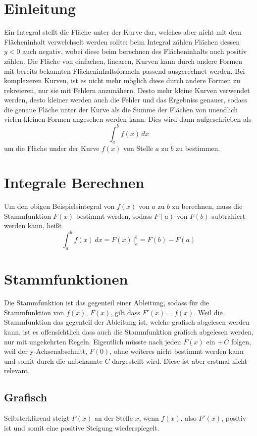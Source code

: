 \documentclass{article}
\begin{document}
 
\section{Einleitung}
Ein Integral stellt die Fläche unter der Kurve dar, welches aber nicht mit dem Flächeninhalt verwelchselt werden sollte: beim Integral zählen Flächen dessen $y<0$ auch negativ, wobei diese beim berechnen des Flächeninhalts auch positiv zählen. \newline
Die Fläche von einfachen, linearen, Kurven kann durch andere Formen mit bereits bekannten Flächeninhaltsformeln passend ausgerechnet werden. Bei komplexeren Kurven, ist es nicht mehr möglich diese durch andere Formen zu rekreieren, nur sie mit Fehlern anzunähern. Desto mehr kleine Kurven verwendet werden, desto kleiner werden auch die Fehler und das Ergebniss genauer, sodass die genaue Fläche unter der Kurve als die Summe der Flächen von unendlich vielen kleinen Formen angesehen werden kann. \newline
Dies wird dann aufgeschrieben als
\[\int_a^b f(x) \,dx\] 
um die Fläche under der Kurve $f(x)$ von Stelle $a$ zu $b$ zu bestimmen.
 
\section{Integrale Berechnen}
Um den obigen Beispielsintegral von $f(x)$ von $a$ zu $b$ zu berechnen, muss die Stammfunktion $F(x)$ bestimmt werden, sodass $F(a)$ von $F(b)$ subtrahiert werden kann, heißt
\[\int_a^b f(x) \,dx =
F(x) \,\Bigr|_a^b =
F(b) - F(a)\]
 
\section{Stammfunktionen}
Die Stammfunktion ist das gegenteil einer Ableitung, sodass für die Stammfunktion von $f(x)$, $F(x)$, gilt dass $F'(x)=f(x)$. Weil die Stammfunktion das gegenteil der Ableitung ist, welche grafisch abgelesen werden kann, ist es offensichtlich dass auch die Stammfunktion grafisch abgelesen werden, nur mit ungekehrten Regeln. \newline
Eigentlich müsste nach jeden $F(x)$ ein $+ \, C$ folgen, weil der y-Achsenabschnitt, $F(0)$, ohne weiteres nicht bestimmt werden kann und somit durch die unbekannte $C$ dargestellt wird. Diese ist aber erstmal nicht relevant. 
 
\subsection{Grafisch}
Selbsterklärend steigt $F(x)$ an der Stelle $x$, wenn $f(x)$, also $F'(x)$, positiv ist und somit eine positive Steigung wiederspiegelt.
 
\end{document}
